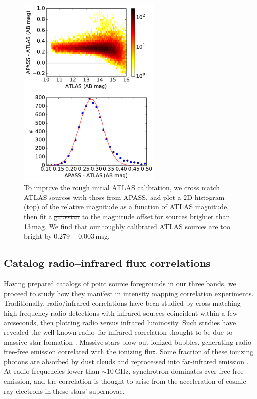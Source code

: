 \documentclass[numberedappendix]{emulateapj}
\providecommand{\DIFadd}[1]{{\protect\color{blue}\uwave{#1}}} %
\providecommand{\DIFdel}[1]{{\protect\color{red}\sout{#1}}}                      %
\providecommand{\DIFaddFL}[1]{\DIFadd{#1}} %
\providecommand{\DIFdelFL}[1]{\DIFdel{#1}} %
\providecommand{\DIFaddbeginFL}{} %
\providecommand{\DIFaddendFL}{} %
\providecommand{\DIFdelbeginFL}{} %
\providecommand{\DIFdelendFL}{} %
\begin{document}
\begin{figure}[t]
\centering
\DIFdelbeginFL %
\DIFdelendFL \DIFaddbeginFL \includegraphics[width=2.75in]{chap5_xcor/ATLAS_vs_APASS_cal.pdf}
\DIFaddendFL \caption[To improve the rough initial ATLAS calibration, we cross match ATLAS sources with those from APASS.]{To improve the rough initial ATLAS calibration, we cross match ATLAS sources with those from APASS, and plot a 2D histogram (top) of the relative magnitude as a function of ATLAS magnitude, then fit a \DIFdelbeginFL \DIFdelFL{gaussian }\DIFdelendFL \DIFaddbeginFL \DIFaddFL{Gaussian }\DIFaddendFL to the magnitude offset for sources brighter than 13\,mag. We find that our roughly calibrated ATLAS sources are too bright by $0.279\pm0.003$\,mag.}
\label{fig:ATLASvsAPASS}
\end{figure}


\subsection{Catalog radio--infrared flux correlations}
\label{sec:catcorrelations}

Having prepared catalogs of point source foregrounds in our three bands, we proceed to study how they manifest in intensity mapping correlation experiments. Traditionally, radio/infrared correlations have been studied by cross matching high frequency radio detections with infrared sources coincident within a few arcseconds, then plotting radio versus infrared luminosity. Such studies have revealed the well known radio--far infrared correlation thought to be due to massive star formation \citep[e.g.][]{helou85,dejong85,yun01,xu94,mauch07,Willott03}. Massive stars blow out ionized bubbles, generating radio free-free emission correlated with the ionizing flux. Some fraction of these ionizing photons are absorbed by dust clouds and reprocessed into far-infrared emission \citep{xu94}. At radio frequencies lower than $\sim10$\,GHz, synchrotron dominates over free-free emission, and the correlation is thought to arise from the acceleration of cosmic ray electrons in these stars' supernovae. 
\end{document}

